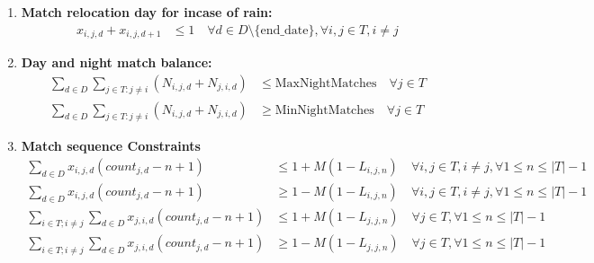 \documentclass[a4paper, 12pt]{article}
\begin{document}
\begin{enumerate}
    \item \textbf{Match relocation day for incase of rain:}
    \begin{align*}
        x_{i,j,d} + x_{i,j,d+1} &\leq 1 \quad \forall d \in D \setminus \{ \text{end\_date} \}, \forall i,j \in T, i \neq j
    \end{align*}

    \item \textbf{Day and night match balance:}
    \begin{align*}
        \sum_{d \in D} \sum_{j \in T : j \neq i} (N_{i,j,d} + N_{j,i,d}) &\leq \text{MaxNightMatches} \quad \forall j \in T\\
        \sum_{d \in D} \sum_{j \in T : j \neq i} (N_{i,j,d} + N_{j,i,d}) &\geq \text{MinNightMatches} \quad \forall j \in T
    \end{align*}

    \item \textbf{Match sequence Constraints}
    \begin{align*}
        \sum_{d \in D} x_{i,j,d} (count_{j,d} - n + 1) &\leq 1 +  M(1 - L_{i,j,n}) \quad \forall i,j \in T, i \neq j, \forall 1 \leq n \leq |T| - 1\\
        \sum_{d \in D} x_{i,j,d} (count_{j,d} - n + 1) &\geq 1 - M(1 - L_{i,j,n}) \quad \forall i,j \in T, i \neq j, \forall 1 \leq n \leq |T| - 1\\
        \sum_{i \in T; i \neq j} \sum_{d \in D} x_{j,i,d} (count_{j,d} - n + 1) &\leq 1 + M(1 - L_{j,j,n}) \quad \forall j \in T,\forall 1 \leq n \leq |T| - 1\\
        \sum_{i \in T; i \neq j} \sum_{d \in D} x_{j,i,d} (count_{j,d} - n + 1) &\geq 1 - M(1 - L_{j,j,n}) \quad \forall j \in T,\forall 1 \leq n \leq |T| - 1
    \end{align*}

\end{enumerate}
\end{document}
